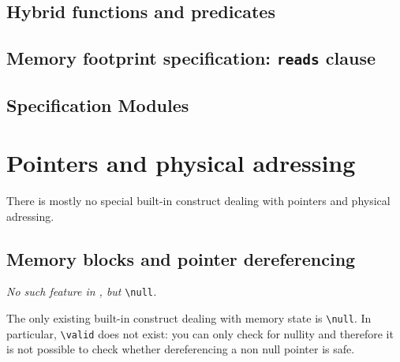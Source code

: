 \subsection{Hybrid functions and predicates}
\label{sec:logicalstates}
\nodiff


\subsection{Memory footprint specification: \texorpdfstring{\lstinline|reads|}{reads} clause}
\absent


\subsection{Specification Modules}
\label{sec:specmodules}
\absent


\section{Pointers and physical adressing}
\label{sec:pointers}

There is mostly no special built-in \eacsl construct dealing with pointers and
physical adressing.


\subsection{Memory blocks and pointer dereferencing}
\label{subsec:memory}
\emph{No such feature in \eacsl, but } \lstinline|\null|\emph{.}

The only existing built-in construct dealing with memory state is
\lstinline|\null|.  In particular, \lstinline|\valid| does not exist: you can
only check for nullity and therefore it is not possible to check whether
dereferencing a non null pointer is safe.

